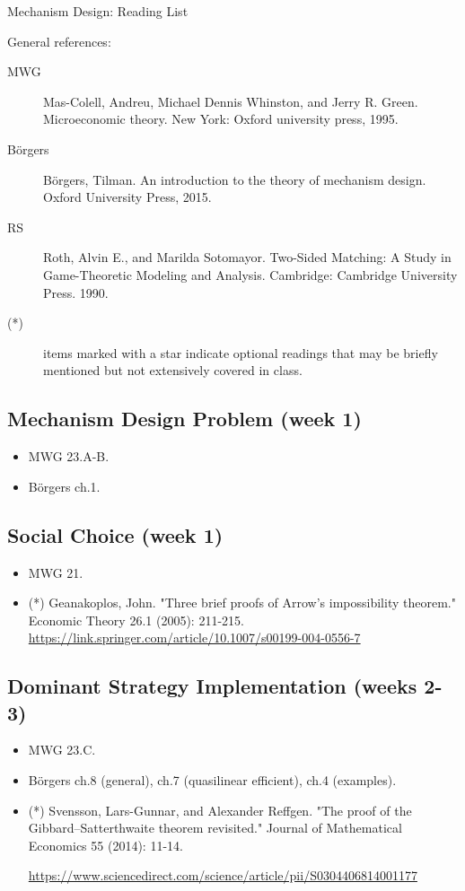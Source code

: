 \documentclass{article}
\begin{document}
\begin{center}
	{\huge Mechanism Design: Reading List}
\end{center}
\bigskip

General references:
\begin{description}
	\item[MWG] Mas-Colell, Andreu, Michael Dennis Whinston, and Jerry R. Green. Microeconomic theory. New York: Oxford university press, 1995. 
	\item[B\"{o}rgers] B\"{o}rgers, Tilman. An introduction to the theory of mechanism design. Oxford University Press, 2015.
	\item[RS] Roth, Alvin E., and Marilda Sotomayor. Two-Sided Matching: A Study in Game-Theoretic Modeling and Analysis. Cambridge: Cambridge University Press. 1990.
	\item[(*)] items marked with a star indicate optional readings that may be briefly mentioned but not extensively covered in class.
\end{description}
\medskip

\subsection{Mechanism Design Problem (week 1)}
\begin{itemize}
	\item MWG 23.A-B.
	\item B{\"o}rgers ch.1.
\end{itemize}

\subsection{Social Choice (week 1)}
\begin{itemize}
	\item MWG 21.
	\item (*) Geanakoplos, John. "Three brief proofs of Arrow’s impossibility theorem." Economic Theory 26.1 (2005): 211-215. \url{https://link.springer.com/article/10.1007/s00199-004-0556-7}
\end{itemize}

\subsection{Dominant Strategy Implementation (weeks 2-3)}
\begin{itemize}
	\item MWG 23.C.
	\item B{\"o}rgers ch.8 (general), ch.7 (quasilinear efficient), ch.4 (examples).
	\item (*) Svensson, Lars-Gunnar, and Alexander Reffgen. "The proof of the Gibbard–Satterthwaite theorem revisited." Journal of Mathematical Economics 55 (2014): 11-14.
	
	\url{https://www.sciencedirect.com/science/article/pii/S0304406814001177}
\end{itemize}
\end{document}
